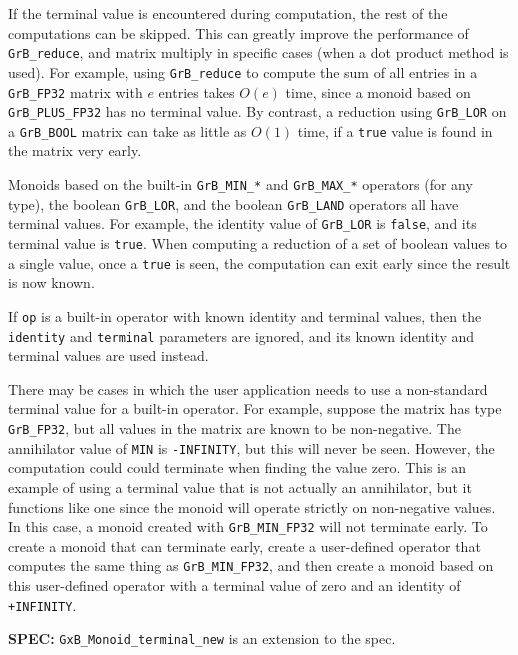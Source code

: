 \documentclass[12pt]{article}
\begin{document}
If the terminal value is encountered during computation, the rest of the
computations can be skipped.  This can greatly improve the performance of
\verb'GrB_reduce', and matrix multiply in specific cases (when a dot product
method is used).  For example, using \verb'GrB_reduce' to compute the sum of
all entries in a \verb'GrB_FP32' matrix with $e$ entries takes $O(e)$ time,
since a monoid based on \verb'GrB_PLUS_FP32' has no terminal value.  By
contrast, a reduction using \verb'GrB_LOR' on a \verb'GrB_BOOL' matrix can take
as little as $O(1)$ time, if a \verb'true' value is found in the matrix very
early.

Monoids based on the built-in \verb'GrB_MIN_*' and \verb'GrB_MAX_*' operators
(for any type), the boolean \verb'GrB_LOR', and the boolean \verb'GrB_LAND'
operators all have terminal values.  For example, the identity value of
\verb'GrB_LOR' is \verb'false', and its terminal value is \verb'true'.  When
computing a reduction of a set of boolean values to a single value, once a
\verb'true' is seen, the computation can exit early since the result is now
known.

If \verb'op' is a built-in operator with known identity and terminal values,
then the \verb'identity' and \verb'terminal' parameters are ignored, and its
known identity and terminal values are used instead.

There may be cases in which the user application needs to use a non-standard
terminal value for a built-in operator.  For example, suppose the matrix has
type \verb'GrB_FP32', but all values in the matrix are known to be
non-negative.  The annihilator value of \verb'MIN' is \verb'-INFINITY', but
this will never be seen.  However, the computation could could terminate when
finding the value zero.  This is an example of using a terminal value that is
not actually an annihilator, but it functions like one since the monoid will
operate strictly on non-negative values.  In this case, a monoid created with
\verb'GrB_MIN_FP32' will not terminate early.  To create a monoid that can
terminate early, create a user-defined operator that computes the same thing as
\verb'GrB_MIN_FP32', and then create a monoid based on this user-defined
operator with a terminal value of zero and an identity of \verb'+INFINITY'.

\begin{spec}
{\bf SPEC:} \verb'GxB_Monoid_terminal_new' is an extension to the spec.
\end{spec}

\end{document}
